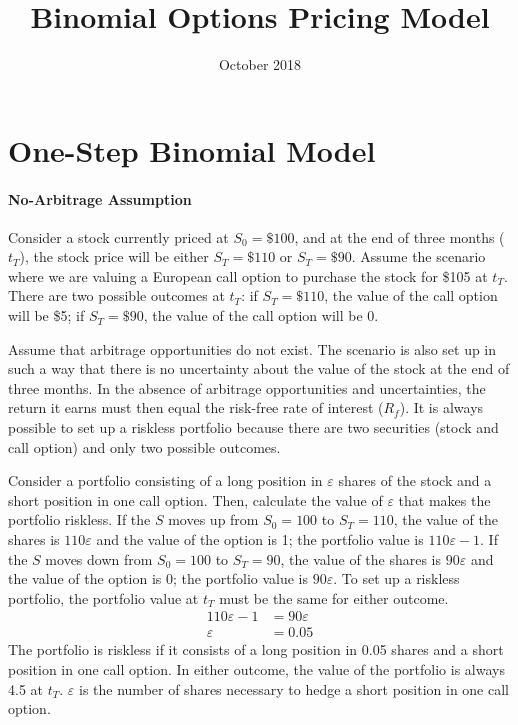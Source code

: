 \documentclass[12pt]{article}
\title{Binomial Options Pricing Model}
\date{October 2018}
\begin{document}
\begin{titlepage}
\maketitle
\end{titlepage}

\section{One-Step Binomial Model}
\paragraph{No-Arbitrage Assumption} \hspace{0pt}

Consider a stock currently priced at $S_{0}=\text{\$100}$, and at the end of three months ($t_{T}$), the stock price will be either $S_{T}=\text{\$110}$ or $S_{T}=\text{\$90}$. Assume the scenario where we are valuing a European call option to purchase the stock for \$105 at $t_{T}$. There are two possible outcomes at $t_{T}$: if $S_{T}=\text{\$110}$, the value of the call option will be \$5; if $S_{T}=\text{\$90}$, the value of the call option will be 0.

Assume that arbitrage opportunities do not exist. The scenario is also set up in such a way that there is no uncertainty about the value of the stock at the end of three months. In the absence of arbitrage opportunities and uncertainties, the return it earns must then equal the risk-free rate of interest ($R_{f}$). It is always possible to set up a riskless portfolio because there are two securities (stock and call option) and only two possible outcomes.

Consider a portfolio consisting of a long position in $\varepsilon$ shares of the stock and a short position in one call option. Then, calculate the value of $\varepsilon$ that makes the portfolio riskless. If the $S$ moves up from $S_{0}=100$ to $S_{T}=110$, the value of the shares is $110\varepsilon$ and the value of the option is 1; the portfolio value is $110\varepsilon-1$. If the $S$ moves down from $S_{0}=100$ to $S_{T}=90$, the value of the shares is $90\varepsilon$ and the value of the option is 0; the portfolio value is $90\varepsilon$. To set up a riskless portfolio, the portfolio value at $t_{T}$ must be the same for either outcome.
\begin{align*}
110\varepsilon-1&=90\varepsilon\\
\varepsilon&=0.05
\end{align*}
The portfolio is riskless if it consists of a long position in 0.05 shares and a short position in one call option. In either outcome, the value of the portfolio is always 4.5 at $t_{T}$. $\varepsilon$ is the number of shares necessary to hedge a short position in one call option.
\end{document}
